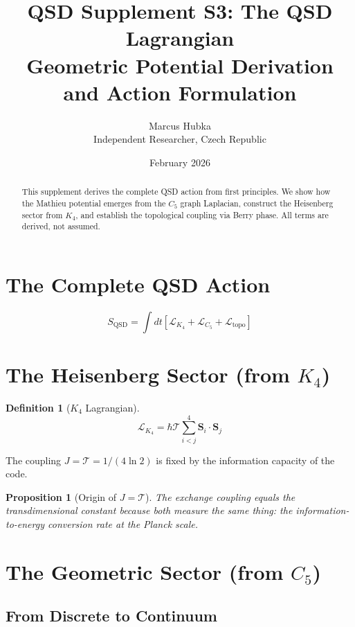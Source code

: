 \documentclass[11pt,a4paper]{article}
\title{\textbf{QSD Supplement S3: The QSD Lagrangian}\\[0.5em]
\large Geometric Potential Derivation and Action Formulation}
\author{Marcus Hubka\\
\small Independent Researcher, Czech Republic}
\date{February 2026}
\newtheorem{proposition}[theorem]{Proposition}
\theoremstyle{definition}
\newtheorem{definition}[theorem]{Definition}
\newcommand{\Tc}{\mathcal{T}}
\newcommand{\LL}{\mathcal{L}}
\begin{document}
\maketitle

\begin{abstract}
This supplement derives the complete QSD action from first principles. We show how the Mathieu potential emerges from the $C_5$ graph Laplacian, construct the Heisenberg sector from $K_4$, and establish the topological coupling via Berry phase. All terms are derived, not assumed.
\end{abstract}

\tableofcontents

\section{The Complete QSD Action}

\begin{equation}
S_{\text{QSD}} = \int dt \left[ \LL_{K_4} + \LL_{C_5} + \LL_{\text{topo}} \right]
\end{equation}

\section{The Heisenberg Sector (from $K_4$)}

\begin{definition}[$K_4$ Lagrangian]
\begin{equation}
\LL_{K_4} = \hbar\Tc \sum_{i<j}^{4} \mathbf{S}_i \cdot \mathbf{S}_j
\end{equation}
\end{definition}

The coupling $J = \Tc = 1/(4\ln 2)$ is fixed by the information capacity of the code.

\begin{proposition}[Origin of $J = \Tc$]
The exchange coupling equals the transdimensional constant because both measure the same thing: the information-to-energy conversion rate at the Planck scale.
\end{proposition}

\section{The Geometric Sector (from $C_5$)}

\subsection{From Discrete to Continuum}
\end{document}
